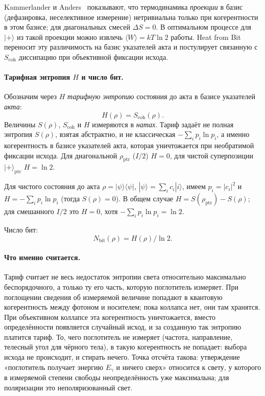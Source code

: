 \documentclass[11pt,a4paper]{article}
\begin{document}
Kammerlander и Anders~\cite{kammerlander2016} показывают, что термодинамика \emph{проекции} в базис (дефазировка, неселективное измерение) нетривиальна только при когерентности в этом базисе; для диагональных смесей $\Delta S=0$. В оптимальном процессе для $|{+}\rangle$ из такой проекции можно извлечь $\langle W\rangle=kT\ln 2$ работы. Heat from Bit переносит эту различимость на базис указателей акта и постулирует связанную с $S_{\mathrm{coh}}$ диссипацию при объективной фиксации исхода.

\paragraph{Тарифная энтропия $H$ и число бит.}
Обозначим через $H$ \emph{тарифную энтропию} состояния до акта в базисе указателей \emph{акта}:
\begin{equation}
H(\rho) = S_{\mathrm{coh}}(\rho).
\end{equation}
Величины $S(\rho)$, $S_{\mathrm{coh}}$ и $H$ измеряются в \emph{натах}. Тариф задаёт не полная энтропия $S(\rho)$, взятая абстрактно, и не классическая $-\sum_i p_i\ln p_i$, а именно когерентность в базисе указателей акта, которая уничтожается при необратимой фиксации исхода. Для диагональной $\rho_{\mathrm{ptr}}$ ($I/2$) $H=0$, для чистой суперпозиции $|{+}\rangle_{\mathrm{ptr}}$ $H=\ln 2$.

Для чистого состояния до акта $\rho=|\psi\rangle\langle\psi|$, $|\psi\rangle=\sum_i c_i|i\rangle$, имеем $p_i=|c_i|^2$ и $H=-\sum_i p_i\ln p_i$ (тогда $S(\rho)=0$). В общем случае $H=S(\rho_{\mathrm{ptr}})-S(\rho)$; для смешанного $I/2$ это $H=0$, хотя $-\sum_i p_i\ln p_i=\ln 2$.

Число бит:
\begin{equation}
N_{\mathrm{bit}}(\rho) = H(\rho) / \ln 2.
\end{equation}

\paragraph{Что именно считается.}
Тариф считает не весь недостаток энтропии света относительно максимально беспорядочного, а только ту его часть, которую поглотитель измеряет. При поглощении сведения об измеряемой величине попадают в квантовую когерентность между фотоном и носителем; пока коллапса нет, они там хранятся. При объективном коллапсе эта когерентность уничтожается, вместо определённости появляется случайный исход, и за созданную так энтропию платится тариф. То, чего поглотитель не измеряет (частота, направление, телесный угол для чёрного тела), в такую когерентность не попадает: выбора исхода не происходит, и стирать нечего. Точка отсчёта такова: утверждение «поглотитель получает энергию $E_\gamma$ и ничего сверх» относится к свету, у которого в измеряемой степени свободы неопределённость уже максимальна; для поляризации это неполяризованный свет.
\end{document}
